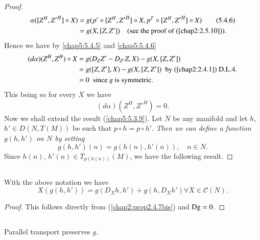 \begin{proof}
\begin{align*}
\alpha([Z^{H},{Z'}^{H}]\circ X) &= g(p'\circ [Z^{H},{Z'}^{H}]\circ X,
p^{T}\circ [Z^{H},{Z'}^{H}]\circ X)\tag{5.4.6}\label{chap5:5.4.6}\\
&= g(X,[Z,Z'])\quad \text{(see the proof of (\ref{chap2:2.5.10})).}
\end{align*}
Hence we have by \eqref{chap5:5.4.5} and \eqref{chap5:5.4.6}
\begin{align*}
(d\alpha)(Z^{H},Z^{H})\circ X &= g(D_{Z}Z'-D_{Z'}Z,X)-g(X,[Z,Z'])\\
&= g([Z,Z'],X)-g(X,[Z,Z'])\text{ \  by (\ref{chap2:2.4.1}) D.L.4.}\\
&= 0\text{ \ since $g$ is symmetric.}
\end{align*}\pageoriginale 
This being so for every $X$ we have
$$
(d\alpha)(Z^{H},{Z'}^{H})=0.
$$
Now we shall extend the result (\ref{chap5:5.3.9}). Let $N$ be any
manifold and let $h$, $h'\in D(N,T(M))$ be such that $p\circ h=p\circ
h'$. {\em Then we can define a function $g(h,h')$ on $N$ by setting}
\begin{equation*}
g(h,h')(n)=g(h(n),h'(n)),\quad n\in N.\tag{5.4.7}\label{chap5:5.4.7}
\end{equation*}
Since $h(n)$, $h'(n)\in T_{p(h(n))}(M)$, we have the following result.
\end{proof}

\setcounter{subsection}{7}

\subsection{}\label{chap5:5.4.8}

\begin{coro*}
With the above notation we have
\begin{equation*}
X(g(h,h'))=g(D_{X}h,h')+g(h,D_{X}h')\forall X\in\mathscr{C}(N).\tag{C.D.7}\label{chap5:C.D.7}
\end{equation*}
\end{coro*}

\begin{proof}
This follows directly from (\ref{chap2:prop2.4.7bis}) and $\operatorname{Dg}=0$. 
\end{proof}

\subsection{}\label{chap5:5.4.9}%

\begin{coro*}
Parallel transport preserves $g$.
\end{coro*}

